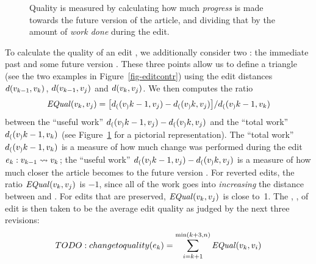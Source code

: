 \begin{figure}
\centering
{}
\caption{Quality is measured by calculating how much \textit{progress}
	is made towards the future version of the article,
	and dividing that by the amount of \textit{work done}
	during the edit.}
\label{fig-editlong}
\end{figure}


  To calculate the quality of an edit ,
  we additionally consider two :
  the immediate past  and some future version .
  These three points allow us to define a triangle
  (see the two examples in Figure~\ref{fig-editcontr})
  using the edit distances $d(v_{k-1},v_{k})$,
  $d(v_{k-1},v_{j})$ and $d(v_{k},v_{j})$.
  We then computes the ratio
  \begin{equation*}
  {\text{\textit{EQual}}}(v_{k},v_{j}) = \bigl[ d_{(}(v_{)}{k-1},v_{j})
  		- d_{(}(v_{)}{k},v_{j}) \bigr]
	/ d_{(}(v_{)}{k-1},v_{k})
  \end{equation*}
  between the ``useful work''
  $d_{(}(v_{)}{k-1},v_{j}) - d_{(}(v_{)}{k},v_{j})$ and the
  ``total work'' $d_{(}(v_{)}{k-1},v_{k})$
  (see Figure~\ref{fig-editlong} for a pictorial representation).
  The ``total work'' $d_{(}(v_{)}{k-1},v_{k})$
  is a measure of how much change
  was performed during the
  edit $e_{k}: v_{k-1} \rightsquigarrow v_{k}$;
  the ``useful work''
  $d_{(}(v_{)}{k-1},v_{j}) - d_{(}(v_{)}{k},v_{j})$
  is a measure of
  how much closer the article becomes to the future version .
  For reverted edits, the ratio ${\text{\textit{EQual}}}(v_{k},v_{j})$
  is $-1$, since all of the work
  goes into \textit{increasing} the distance between  and .
  For edits that are preserved, ${\text{\textit{EQual}}}(v_{k},v_{j})$ is close to~1.
  The , \elong, of edit  is then taken to
  be the average edit quality as judged by the next three revisions:
  \begin{equation*}
      TODO: change to quality(e_{k}) = \sum_{i=k+1}^{\min(k+3, n)}
      		{\text{\textit{EQual}}}(v_{k},v_{i})
  \end{equation*}

